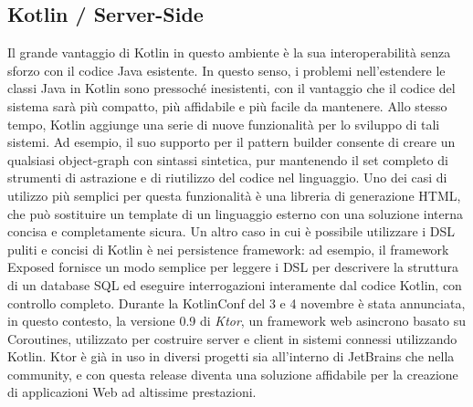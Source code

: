 \subsection{Kotlin / Server-Side}
Il grande vantaggio di Kotlin in questo ambiente è la sua interoperabilità senza sforzo con il codice Java esistente. In questo senso, i problemi nell’estendere le classi Java in Kotlin sono pressoché inesistenti, con il vantaggio che il codice del sistema sarà più compatto, più affidabile e più facile da mantenere. Allo stesso tempo, Kotlin aggiunge una serie di nuove funzionalità per lo sviluppo di tali sistemi. Ad esempio, il suo supporto per il pattern builder consente di creare un qualsiasi object-graph con sintassi sintetica, pur mantenendo il set completo di strumenti di astrazione e di riutilizzo del codice nel linguaggio. Uno dei casi di utilizzo più semplici per questa funzionalità è una libreria di generazione HTML, che può sostituire un template di un linguaggio esterno con una soluzione interna concisa e completamente sicura. Un altro caso in cui è possibile utilizzare i DSL puliti e concisi di Kotlin è nei persistence framework: ad esempio, il framework Exposed fornisce un modo semplice per leggere i DSL per descrivere la struttura di un database SQL ed eseguire interrogazioni interamente dal codice Kotlin, con controllo completo. Durante la KotlinConf del 3 e 4 novembre è stata annunciata, in questo contesto, la versione 0.9 di {\em Ktor}, un framework web asincrono basato su Coroutines, utilizzato per costruire server e client in sistemi connessi utilizzando Kotlin. Ktor è già in uso in diversi progetti sia all'interno di JetBrains che nella community, e con questa release diventa una soluzione affidabile per la creazione di applicazioni Web ad altissime prestazioni.\\

